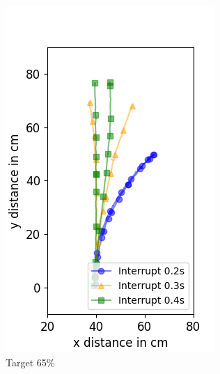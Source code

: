 \begin{figure}
\begin{subfigure}[b]{0.32\textwidth}
		\includegraphics[width=\textwidth]{pics/figure_65.png}
		\caption{Target 65\%}
		\label{fig:target_65}
	\end{subfigure}
	\begin{subfigure}[b]{0.32\textwidth}

\end{subfigure}
\end{figure}
